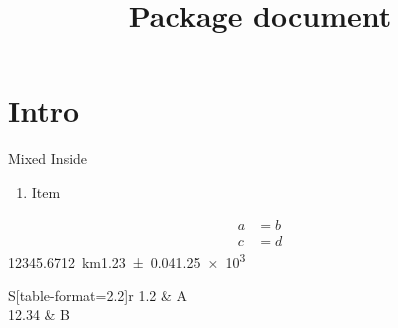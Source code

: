 \documentclass{article}
\title{Package document}
\begin{document}
\section{Intro}\label{sec:intro}
\textcolor{red!50!blue}{Mixed}
{\color{local}Inside}
\begin{enumerate}[label=\alph*.,start=3]
\item[Custom] Item
\end{enumerate}
\begin{align}
a &= b\\
c &= d
\end{align}
\num{12345.67}\qty{12}{\kilo\metre}\num{1.23(4)}\num{1.25e3}
\begin{tabular}{S[table-format=2.2]r}
1.2 & A\\
12.34 & B
\end{tabular}
\cite{knuth}
\printbibliography
\end{document}
